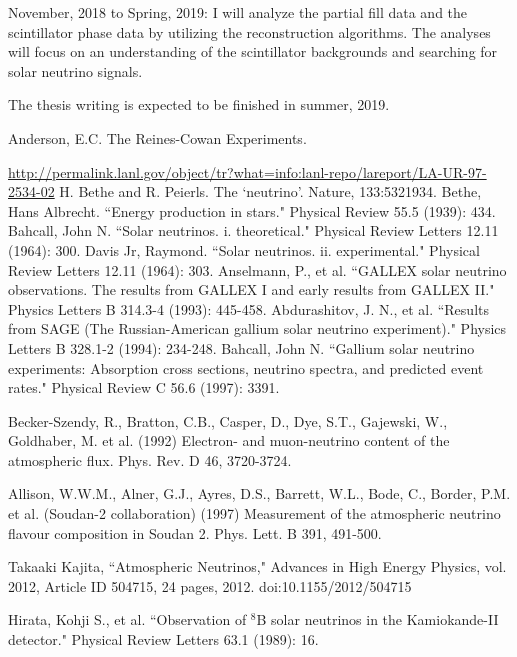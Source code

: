 \documentclass[preprint,12pt]{elsarticle}
\numberwithin{equation}{section}
\begin{document}
November, 2018 to Spring, 2019: I will analyze the partial fill data and the scintillator phase data by utilizing the reconstruction algorithms. The analyses will focus on an understanding of the scintillator backgrounds and searching for solar neutrino signals.

The thesis writing is expected to be finished in summer, 2019.

\vspace{30mm}


\begin{thebibliography}{00}
 Anderson, E.C. The Reines-Cowan Experiments. 

\url{http://permalink.lanl.gov/object/tr?what=info:lanl-repo/lareport/LA-UR-97-2534-02}
 H. Bethe and R. Peierls. The `neutrino'. Nature, 133:5321934.
 Bethe, Hans Albrecht. ``Energy production in stars." Physical Review 55.5 (1939): 434.
 Bahcall, John N. ``Solar neutrinos. i. theoretical." Physical Review Letters 12.11 (1964): 300.
 Davis Jr, Raymond. ``Solar neutrinos. ii. experimental." Physical Review Letters 12.11 (1964): 303.
 Anselmann, P., et al. ``GALLEX solar neutrino observations. The results from GALLEX I and early results from GALLEX II." Physics Letters B 314.3-4 (1993): 445-458.
 Abdurashitov, J. N., et al. ``Results from SAGE (The Russian-American gallium solar neutrino experiment)." Physics Letters B 328.1-2 (1994): 234-248.
 Bahcall, John N. ``Gallium solar neutrino experiments: Absorption cross sections, neutrino spectra, and predicted event rates." Physical Review C 56.6 (1997): 3391.

 Becker-Szendy, R., Bratton, C.B., Casper, D., Dye, S.T., Gajewski, W., Goldhaber, M. et al. (1992) Electron- and muon-neutrino content of the atmospheric flux. Phys. Rev. D 46, 3720-3724.

 Allison, W.W.M., Alner, G.J., Ayres, D.S., Barrett, W.L., Bode, C., Border, P.M. et al. (Soudan-2 collaboration) (1997) Measurement of the atmospheric neutrino flavour composition in Soudan 2. Phys. Lett. B 391, 491-500.

 Takaaki Kajita, ``Atmospheric Neutrinos," Advances in High Energy Physics, vol. 2012, Article ID 504715, 24 pages, 2012. doi:10.1155/2012/504715

 Hirata, Kohji S., et al. ``Observation of $^8$B solar neutrinos in the Kamiokande-II detector." Physical Review Letters 63.1 (1989): 16.


\end{thebibliography}
\end{document}
